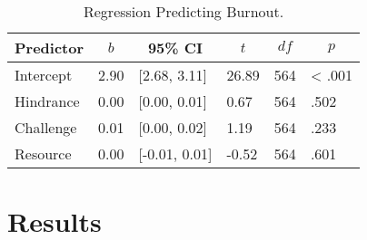 \documentclass[
  man]{apa6}
\begin{document}
\begin{table}[tbp]

\begin{center}
\begin{threeparttable}

\caption{\label{tab:regression_table_bur}Regression Predicting Burnout.}

\begin{tabular}{llllll}
\toprule
Predictor & \multicolumn{1}{c}{$b$} & \multicolumn{1}{c}{95\% CI} & \multicolumn{1}{c}{$t$} & \multicolumn{1}{c}{$\mathit{df}$} & \multicolumn{1}{c}{$p$}\\
\midrule
Intercept & 2.90 & {}[2.68, 3.11] & 26.89 & 564 & < .001\\
Hindrance & 0.00 & {}[0.00, 0.01] & 0.67 & 564 & .502\\
Challenge & 0.01 & {}[0.00, 0.02] & 1.19 & 564 & .233\\
Resource & 0.00 & {}[-0.01, 0.01] & -0.52 & 564 & .601\\
\bottomrule
\end{tabular}

\end{threeparttable}
\end{center}

\end{table}

\hypertarget{results}{%
\section{Results}\label{results}}
\end{document}
